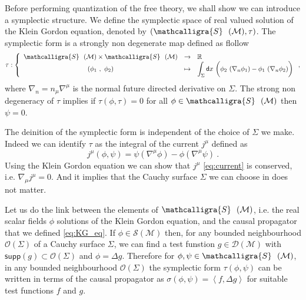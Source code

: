 \documentclass[10pt]{book}
\newcommand{\supp}{\mathsf{supp}}
\newcommand{\sm}[1]{\left\langle#1\right\rangle}
\let\int\int
\def\bigint{\displaystyle\int}
\newcommand{\Dcal}{\mathcal{D}}
\newcommand{\Mcal}{\mathcal{M}}
\newcommand{\Ocal}{\mathcal{O}}
\newcommand{\Scal}{\mathcal{S}}
\newcommand{\Rbb}{\mathbb{R}}
\newcommand{\dsf}{\mathsf{d}}
\theoremstyle{break}
\begin{document}
\bigskip


Before performing quantization of the free theory, we shall show we can introduce a symplectic structure. We define the symplectic space of real valued solution of the Klein Gordon equation, denoted by $(\mathcalligra{S} \ \ (\Mcal),\tau)$. The symplectic form is a strongly non degenerate map  defined as flollow
%
\begin{equation*}
\tau : \left\{
\begin{array}{ccl}
\mathcalligra{S} \ \ (\Mcal) \times \mathcalligra{S} \ \ (\Mcal) & \to & \Rbb \\
(\phi_1 \ , \ \phi_2) & \mapsto & \bigint_\Sigma  \dsf x \ \bigg( \phi_2 \ (\nabla_n \phi_1) - \phi_1 \ (\nabla_n \phi_2) \bigg)
\end{array}
\right. ,
\end{equation*}
%
where $\nabla_n = n_\mu \nabla^\mu$ is the normal future directed derivative on $\Sigma$. The strong non degeneracy of $\tau$ implies if $\tau(\phi,\tau)=0$ for all $\phi \in \mathcalligra{S} \ \ (\Mcal)$ then $\psi=0$.


\bigskip


The deinition of the symplectic form is independent of the choice of $\Sigma$ we make. Indeed we can identify $\tau$ as the integral of the current $j^\mu$ defined as
%
\begin{equation*}
j^\mu (\phi,\psi) = \psi (\nabla^\mu \phi) - \phi (\nabla^\mu \psi) \ . 
\label{eq:current}
\end{equation*}
%
Using the Klein Gordon equation we can show that $j^\mu$ \eqref{eq:current} is conserved, i.e. $\nabla_\mu j^\mu = 0$. And it implies that the Cauchy surface $\Sigma$ we can choose in does not matter. 


\bigskip


Let us do the link between the elements of $\mathcalligra{S} \ \ (\Mcal)$, i.e. the real scalar fields $\phi$ solutions of the Klein Gordon equation, and the causal propagator that we defined \eqref{eq:KG_eq}. If $\phi \in \Scal(\Mcal)$ then, for any bounded neighbourhood $\Ocal(\Sigma)$ of a Cauchy surface $\Sigma$, we can find a test funstion $g\in \Dcal(\Mcal)$ with $\supp\left(g\right) \subset \Ocal(\Sigma)$ and $\phi = \Delta g$. Therefore for $\phi , \psi \in \mathcalligra{S} \ \ (\Mcal)$, in any bounded neighbourhood $\Ocal(\Sigma)$ the symplectic form $\tau(\phi, \psi)$ can be written in terms of the causal propagator as $\sigma(\phi,\psi) = \sm{f , \Delta g}$ for suitable test functions $f$ and $g$. 
\end{document}
